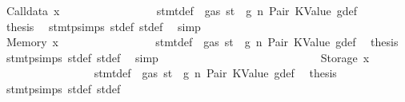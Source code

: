\begin{isabellebody}
\ {\isacharparenleft}{\kern0pt}Calldata\ x{}{\isacharparenright}{\kern0pt}\isanewline
\ \ \ \ \ \ \ \ \ \ \ \ \ \ \isamarkupfalse%
\ {}{\isacharparenleft}{\kern0pt}{}{\isacharparenright}{\kern0pt}\ stmt{\isacharunderscore}{\kern0pt}def\ {\isacharbackquoteopen}{\isasymnot}\ gas\ st\ {\isasymle}\ g{\isacharbackquoteclose}\ n\ Pair\ KValue\ g{\isacharunderscore}{\kern0pt}def\ \isamarkupfalse%
\ {\isacharquery}{\kern0pt}thesis\ \isamarkupfalse%
\ stmt{\isachardot}{\kern0pt}psimps{\isacharparenleft}{\kern0pt}{}{\isacharparenright}{\kern0pt}\ st{\isacharprime}{\kern0pt}{\isacharunderscore}{\kern0pt}def\ st{\isacharprime}{\kern0pt}{\isacharprime}{\kern0pt}{\isacharunderscore}{\kern0pt}def\ \isamarkupfalse%
\ simp\isanewline
\ \ \ \ \ \ \ \ \ \ \ \ \isamarkupfalse%
\isanewline
\ \ \ \ \ \ \ \ \ \ \ \ \ \ \isamarkupfalse%
\ {\isacharparenleft}{\kern0pt}Memory\ x{}{\isacharparenright}{\kern0pt}\isanewline
\ \ \ \ \ \ \ \ \ \ \ \ \ \ \isamarkupfalse%
\ {}{\isacharparenleft}{\kern0pt}{}{\isacharparenright}{\kern0pt}\ stmt{\isacharunderscore}{\kern0pt}def\ {\isacharbackquoteopen}{\isasymnot}\ gas\ st\ {\isasymle}\ g{\isacharbackquoteclose}\ n\ Pair\ KValue\ g{\isacharunderscore}{\kern0pt}def\ \isamarkupfalse%
\ {\isacharquery}{\kern0pt}thesis\ \isamarkupfalse%
\ stmt{\isachardot}{\kern0pt}psimps{\isacharparenleft}{\kern0pt}{}{\isacharparenright}{\kern0pt}\ st{\isacharprime}{\kern0pt}{\isacharunderscore}{\kern0pt}def\ st{\isacharprime}{\kern0pt}{\isacharprime}{\kern0pt}{\isacharunderscore}{\kern0pt}def\ \isamarkupfalse%
\ simp\isanewline
\ \ \ \ \ \ \ \ \ \ \ \ \isamarkupfalse%
\isanewline
\ \ \ \ \ \ \ \ \ \ \ \ \ \ \isamarkupfalse%
\ {\isacharparenleft}{\kern0pt}Storage\ x{}{\isacharparenright}{\kern0pt}\isanewline
\ \ \ \ \ \ \ \ \ \ \ \ \ \ \isamarkupfalse%
\ {}{\isacharparenleft}{\kern0pt}{}{\isacharparenright}{\kern0pt}\ stmt{\isacharunderscore}{\kern0pt}def\ {\isacharbackquoteopen}{\isasymnot}\ gas\ st\ {\isasymle}\ g{\isacharbackquoteclose}\ n\ Pair\ KValue\ g{\isacharunderscore}{\kern0pt}def\ \isamarkupfalse%
\ {\isacharquery}{\kern0pt}thesis\ \isamarkupfalse%
\ stmt{\isachardot}{\kern0pt}psimps{\isacharparenleft}{\kern0pt}{}{\isacharparenright}{\kern0pt}\ st{\isacharprime}{\kern0pt}{\isacharunderscore}{\kern0pt}def\ st{\isacharprime}{\kern0pt}{\isacharprime}{\kern0pt}{\isacharunderscore}{\kern0pt}def\ \isamarkupfalse%

\end{isabellebody}
